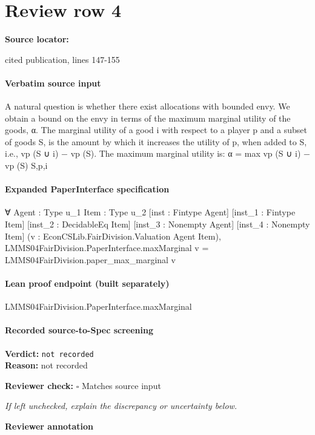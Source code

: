 \documentclass[10pt]{article}
\newcommand{\reviewerbox}{%
  \par\noindent\fbox{\parbox{0.96\linewidth}{\rule{0pt}{0.38in}}}\par
}
\newcommand{\reviewmatch}[1]{%
  \par\noindent\textbf{Reviewer check:} $\square$\; #1\par
  \noindent\emph{If left unchecked, explain the discrepancy or uncertainty below.}\par
}
\begin{document}
\section*{Review row 4}
\textbf{Source locator:} {\footnotesize\raggedright cited publication, lines 147-\allowbreak{}155\par}
\paragraph{Verbatim source input}
\begin{ReviewVerbatim}
A natural question is whether there exist allocations with
bounded envy. We obtain a bound on the envy in terms of
the maximum marginal utility of the goods, α. The marginal
utility of a good i with respect to a player p and a subset of
goods S, is the amount by which it increases the utility of
p, when added to S, i.e., vp (S ∪ {i}) − vp (S). The maximum
marginal utility is:
α = max vp (S ∪ {i}) − vp (S)
S,p,i
\end{ReviewVerbatim}


\paragraph{Expanded PaperInterface specification}
\begin{ReviewVerbatim}
∀ {Agent : Type u_1} {Item : Type u_2} [inst : Fintype Agent] [inst_1 : Fintype Item] [inst_2 : DecidableEq Item]
  [inst_3 : Nonempty Agent] [inst_4 : Nonempty Item] (v : EconCSLib.FairDivision.Valuation Agent Item),
  LMMS04FairDivision.PaperInterface.maxMarginal v = LMMS04FairDivision.paper_max_marginal v
\end{ReviewVerbatim}

\paragraph{Lean proof endpoint (built separately)}\begin{ReviewVerbatim}
LMMS04FairDivision.PaperInterface.maxMarginal
\end{ReviewVerbatim}

\paragraph{Recorded source-to-Spec screening}
\textbf{Verdict:} \texttt{not recorded}
\\
\textbf{Reason:} not recorded
\reviewmatch{Matches source input}
\noindent\textbf{Reviewer annotation}\par
\reviewerbox
\clearpage
\hypertarget{source-claim-72f05d50cd4ce742}{}
\end{document}

